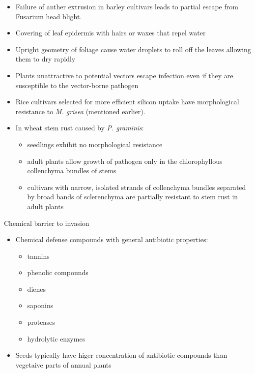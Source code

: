 \documentclass[11pt,dvipsnames,ignorenonframetext,aspectratio=169]{beamer}
\providecommand{\tightlist}{%
  \setlength{\itemsep}{0pt}\setlength{\parskip}{0pt}}
\begin{document}
\begin{frame}{}
\protect\hypertarget{section-17}{}
\begin{itemize}
\tightlist
\item
  Failure of anther extrusion in barley cultivars leads to partial
  escape from Fusarium head blight.
\item
  Covering of leaf epidermis with hairs or waxes that repel water
\item
  Upright geometry of foliage cause water droplets to roll off the
  leaves allowing them to dry rapidly
\item
  Plants unattractive to potential vectors escape infection even if they
  are susceptible to the vector-borne pathogen
\item
  Rice cultivars selected for more efficient silicon uptake have
  morphological resistance to \textit{M. grisea} (mentioned earlier).
\item
  In wheat stem rust caused by \textit{P. graminis}:

  \begin{itemize}
  \tightlist
  \item
    seedlings exhibit no morphological resistance
  \item
    adult plants allow growth of pathogen only in the chlorophyllous
    collenchyma bundles of stems
  \item
    cultivars with narrow, isolated strands of collenchyma bundles
    separated by broad bands of sclerenchyma are partially resistant to
    stem rust in adult plants
  \end{itemize}
\end{itemize}
\end{frame}

\begin{frame}{Chemical barrier to invasion}
\protect\hypertarget{chemical-barrier-to-invasion}{}
\begin{itemize}
\tightlist
\item
  Chemical defense compounds with general antibiotic properties:

  \begin{itemize}
  \tightlist
  \item
    tannins
  \item
    phenolic compounds
  \item
    dienes
  \item
    saponins
  \item
    proteases
  \item
    hydrolytic enzymes
  \end{itemize}
\item
  Seeds typically have higer concentration of antibiotic compounds than
  vegetaive parts of annual plants
\end{itemize}
\end{frame}
\end{document}
